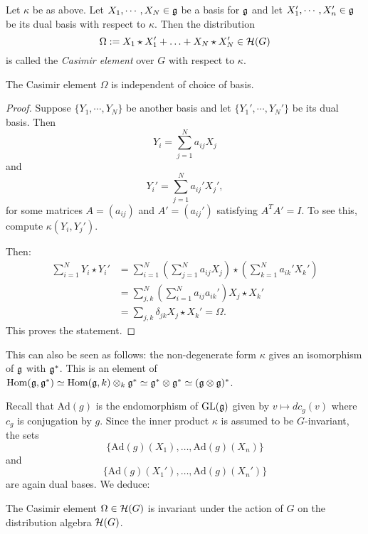 \documentclass[11pt, english]{article}
\begin{document}
\begin{defi}

Let $\kappa$ be as above. Let $X_1,\cdots,X_N \in \mathfrak g$ be a basis for $\mathfrak g$ and let $X_1',\cdots,X_n' \in \mathfrak g$ be its dual basis with respect to $\kappa$. Then the distribution
$$
\Omega := X_1 \star X_1' + \ldots + X_N \star X_N' \in \mathcal{H}(G)
$$
is called the \emph{Casimir element} over $G$ with respect to $\kappa$.
\end{defi}

\begin{prop}
 The Casimir element $\Omega$ is independent of choice of basis.
\end{prop}
\begin{proof}
Suppose $\{ Y_1, \cdots, Y_N \}$ be another basis and let $ \{ Y_1',\cdots, Y_N'\}$ be its dual basis. Then
$$
Y_i = \sum_{j=1}^N a_{ij} X_j
$$
and
$$
Y_i' = \sum_{j=1}^N a_{ij}' X_j',
$$
for some matrices $A=(a_{ij})$ and $A'=(a_{ij}')$ satisfying $A^TA'=I$. To see this, compute $\kappa(Y_i,Y_j')$. 

Then:
\begin{align*}
\sum_{i=1}^N Y_i \star Y_i' &= \sum_{i=1}^N\left(\sum_{j=1}^N a_{ij} X_j \right) \star \left( \sum_{k=1}^N a_{ik}' X_k' \right) \\
&= \sum_{j,k}^N \left( \sum_{i=1}^N a_{ij} a_{ik}' \right) X_j \star X_k' \\
&= \sum_{j,k} \delta_{jk} X_j \star X_k' = \Omega.
\end{align*}
This proves the statement.
\end{proof}
\begin{remark}
This can also be seen as follows: the non-degenerate form $\kappa$ gives an isomorphism of $\mathfrak g$ with $\mathfrak g^\ast$. This is an element of $\operatorname{Hom}(\mathfrak g,\mathfrak g^\ast)\simeq \operatorname{Hom}(\mathfrak g,k) \otimes_k \mathfrak g^\ast \simeq \mathfrak g^\ast \otimes \mathfrak g^\ast \simeq (\mathfrak g \otimes \mathfrak g)^\ast$.
\end{remark}


Recall that $\mathrm{Ad}(g)$ is the endomorphism of $\operatorname{GL}(\mathfrak g)$ given by $v \mapsto dc_g(v)$ where $c_g$ is conjugation by $g$. Since the inner product $\kappa$ is assumed to be $G$-invariant, the sets
$$
\{ \mathrm{Ad}(g)(X_1),\ldots, \mathrm{Ad}(g)(X_n) \}
$$ 
and 
$$
\{ \mathrm{Ad}(g)(X_1'),\ldots, \mathrm{Ad}(g)(X_n') \}
$$ 
are again dual bases. We deduce:
\begin{corr}
The Casimir element $\Omega \in \mathcal{H}(G)$ is invariant under the action of $G$ on the distribution algebra $\mathcal{H}(G)$.
\end{corr}
\end{document}
